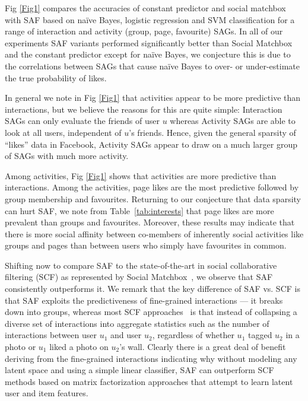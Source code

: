 Fig \ref{Fig1} compares the accuracies of constant predictor and
social matchbox with SAF based on na\"{i}ve Bayes, logistic regression
and SVM classification for a range of interaction and activity (group,
page, favourite) SAGs.  In all of our experiments SAF variants
performed significantly better than Social Matchbox and the constant
predictor except for na\"{i}ve Bayes, we conjecture this is due to the
correlations between SAGs that cause na\"{i}ve Bayes to over- or
under-estimate the true probability of likes.

In general we note in Fig \ref{Fig1} that activities appear to be
more predictive than interactions, but we believe the reasons for this
are quite simple: Interaction SAGs can only evaluate the friends of
user $u$ whereas Activity SAGs are able to look at all users,
independent of $u$'s friends.
Hence, given the general sparsity of ``likes'' data in Facebook, 
Activity SAGs appear to draw on a much larger group of SAGs
with much more activity.

Among activities, Fig \ref{Fig1} shows that activities are more
predictive than interactions. Among the activities, page likes are the
most predictive followed by group membership and favourites.
Returning to our conjecture that data sparsity can hurt SAF, we note
from Table~\ref{tab:interests} that page likes are more prevalent than
groups and favourites.  Moreover, these results may indicate that
there is more social affinity between co-members of inherently social
activities like groups and pages than between users who simply have
favourites in common.

Shifting now to compare SAF to the state-of-the-art in social
collaborative filtering (SCF) as represented by Social
Matchbox~\cite{Noel2012NOF}, we observe that SAF consistently
outperforms it.  We remark that the key difference of SAF vs. SCF is
that SAF exploits the predictiveness of fine-grained interactions ---
it breaks down into groups, whereas most SCF
approaches~\cite{Noel2012NOF,lla,socinf,sr,rrmf,sorec,ste} is that
instead of collapsing a diverse set of interactions into aggregate
statistics such as the number of interactions between user $u_1$ and
user $u_2$, regardless of whether $u_1$ tagged $u_2$ in a photo or
$u_1$ liked a photo on $u_2$'s wall.  Clearly there is a great deal of
benefit deriving from the fine-grained interactions indicating why
without modeling any latent space and using a simple linear
classifier, SAF can outperform SCF methods based on matrix
factorization approaches that attempt to learn latent user and item
features.

